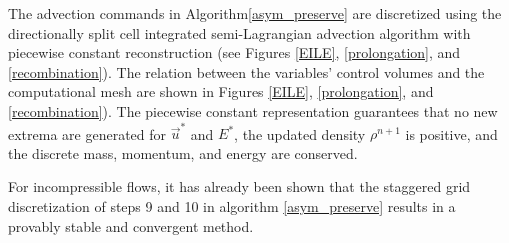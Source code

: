 \documentclass[]{article}
\begin{document}
The advection commands in Algorithm\ref{asym_preserve} are discretized using the
directionally split cell integrated semi-Lagrangian advection algorithm
with piecewise constant 
reconstruction\cite{jemison2014compressible,scardovelli2003interface}
(see Figures 
  \ref{EILE},
  \ref{prolongation},
  and \ref{recombination}).
The relation between the
variables' control volumes and the computational mesh are shown
in Figures 
  \ref{EILE},
  \ref{prolongation},
  and \ref{recombination}).
The piecewise constant representation guarantees
that no new extrema are generated for $\vec{u}^{\ast}$ and $E^{\ast}$, the
updated density $\rho^{n+1}$ is positive, and the discrete mass,
momentum, and energy are conserved.

For incompressible flows, it has already been shown that the
staggered grid discretization \cite{LECHENADEC2013185} of steps
9 and 10 in algorithm \ref{asym_preserve}
results in a provably stable and convergent method.
\end{document}
